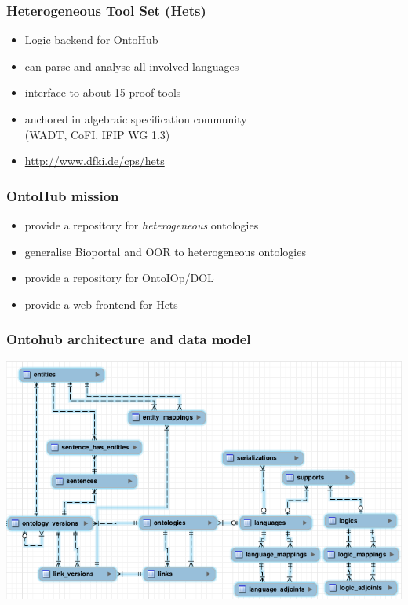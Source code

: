 \documentclass[german]{beamer}
\begin{document}
\begin{frame}
\frametitle{Heterogeneous Tool Set (Hets)}
\begin{itemize}
\item Logic backend for OntoHub
\item can parse and analyse all involved languages
\item interface to about 15 proof tools
\item anchored in algebraic specification community\\ (WADT, CoFI, IFIP WG 1.3) 
\item \url{http://www.dfki.de/cps/hets}
\end{itemize}
\end{frame}


\begin{frame}
\frametitle{OntoHub mission}
\begin{itemize}
\item provide a repository for \emph{heterogeneous} ontologies
\item generalise Bioportal and OOR to heterogeneous ontologies
\item provide a repository for OntoIOp/DOL
\item provide a web-frontend for Hets
\end{itemize}
\end{frame}

\begin{frame}
\frametitle{Ontohub architecture and data model}
\includegraphics[width=\textwidth]{DBVisualization.png}
\end{frame}
\end{document}
